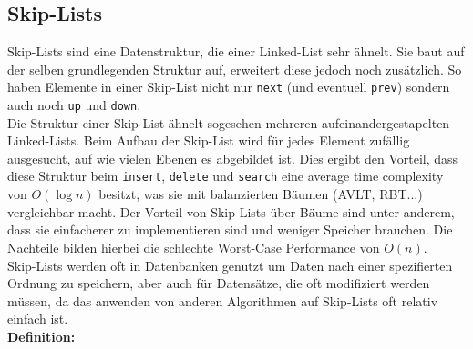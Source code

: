 \documentclass[
../AuD-Zusammenfassung.tex,
]
{subfiles}
\begin{document}
\subsection{Skip-Lists}
Skip-Lists sind eine Datenstruktur, die einer Linked-List sehr ähnelt. Sie baut auf der selben grundlegenden Struktur auf, erweitert diese jedoch noch zusätzlich. So haben Elemente in einer Skip-List nicht nur \texttt{next} (und eventuell \texttt{prev}) sondern auch noch \texttt{up} und \texttt{down}. \\
Die Struktur einer Skip-List ähnelt sogesehen mehreren aufeinandergestapelten Linked-Lists. Beim Aufbau der Skip-List wird für jedes Element zufällig ausgesucht, auf wie vielen Ebenen es abgebildet ist. Dies ergibt den Vorteil, dass diese Struktur beim \texttt{insert}, \texttt{delete} und \texttt{search} eine average time complexity von $O(\log n)$ besitzt, was sie mit balanzierten Bäumen (AVLT, RBT...) vergleichbar macht. Der Vorteil von Skip-Lists über Bäume sind unter anderem, dass sie einfacherer zu implementieren sind und weniger Speicher brauchen. Die Nachteile bilden hierbei die schlechte Worst-Case Performance von $O(n)$.\\
Skip-Lists werden oft in Datenbanken genutzt um Daten nach einer spezifierten Ordnung zu speichern, aber auch für Datensätze, die oft modifiziert werden müssen, da das anwenden von anderen Algorithmen auf Skip-Lists oft relativ einfach ist.\\

\textbf{Definition:}

\begin{algorithm}[H]
\end{algorithm}
\end{document}
